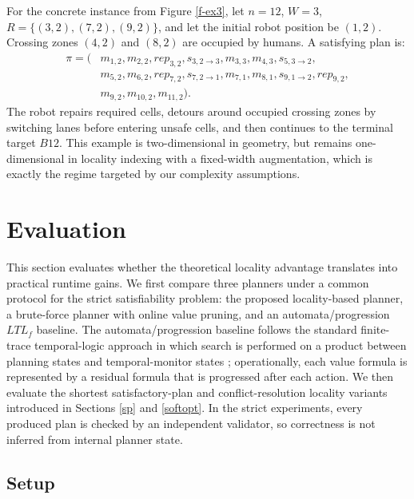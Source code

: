 \documentclass[]{jair}
\begin{document}
For the concrete instance from Figure \ref{f-ex3}, let $n=12$, $W=3$, $R=\{(3,2),(7,2),(9,2)\}$, and let the initial robot position be $(1,2)$.
Crossing zones $(4,2)$ and $(8,2)$ are occupied by humans.
A satisfying plan is:
\begin{equation*}
\begin{split}
\pi = (&m_{1,2}, m_{2,2}, rep_{3,2}, s_{3,2\to 3}, m_{3,3}, m_{4,3}, s_{5,3\to 2},\\
      &m_{5,2}, m_{6,2}, rep_{7,2}, s_{7,2\to 1}, m_{7,1}, m_{8,1}, s_{9,1\to 2}, rep_{9,2},\\
      &m_{9,2}, m_{10,2}, m_{11,2}).
\end{split}
\end{equation*}
The robot repairs required cells, detours around occupied crossing zones by switching lanes before entering unsafe cells, and then continues to the terminal target $B12$.
This example is two-dimensional in geometry, but remains one-dimensional in locality indexing with a fixed-width augmentation, which is exactly the regime targeted by our complexity assumptions.

\section{Evaluation}\label{eval}

This section evaluates whether the theoretical locality advantage translates into practical runtime gains. We first compare three planners under a common protocol for the strict satisfiability problem: the proposed locality-based planner, a brute-force planner with online value pruning, and an automata/progression $LTL_f$ baseline. The automata/progression baseline follows the standard finite-trace temporal-logic approach in which search is performed on a product between planning states and temporal-monitor states \cite{degiacomo2013ltlf,camacho2018finite}; operationally, each value formula is represented by a residual formula that is progressed after each action. We then evaluate the shortest satisfactory-plan and conflict-resolution locality variants introduced in Sections \ref{sp} and \ref{softopt}. In the strict experiments, every produced plan is checked by an independent validator, so correctness is not inferred from internal planner state.

\subsection{Setup}
\end{document}

